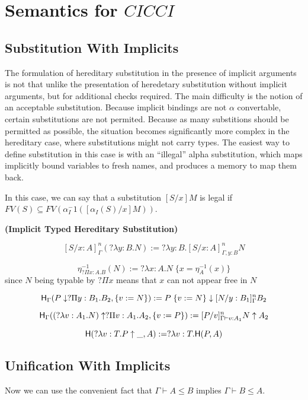 \section{Semantics for $CICCI$}


\subsection{Substitution With Implicits}

The formulation of hereditary substitution in the presence of 
implicit arguments is not that unlike the presentation of
heredetary substitution without implicit arguments, 
but for additional checks required.
The main difficulty is the notion of an acceptable substitution. 
Because implicit bindings are not $\alpha$ convertable, 
certain substitutions are not permited.  
Because as many substitions should be permitted as possible, 
the situation becomes significantly more complex in the 
hereditary case, where substitutions might not carry types.  
The easiest way to define substitution in this case is with an ``illegal'' alpha substitution, 
which maps implicitly bound variables to fresh names, 
and produces a memory to map them back.

In this case, we can say that a substitution $[S/x] M$ is legal if 
$FV(S) \subseteq FV(\alpha_I^-1( [\alpha_I(S)/x] M) )$.

\begin{definition}
\textbf{(Implicit Typed Hereditary Substitution)}


\[
[S / x : A]^n_{\Gamma } (?\lambda y : B . N) := ?\lambda y:B . [S / x : A]^n_{\Gamma, y : B} N
\] 

\[
\eta^{-1}_{?\Pi x : A . B}(N) := ?\lambda x : A . N \; \{ x = \eta^{-1}_A(x) \}
\] since $N$ being typable by $?\Pi x $ means that $x$ can not appear free in $N$

\[
\mathsf{H}_{\Gamma}(P \downarrow ?\Pi y : B_1 . B_2 , \{ v := N \} ) := P\; \{ v := N \} \downarrow [N/y : B_1]^n_{\Gamma}B_2
\]

\[
\mathsf{H}_{\Gamma} ((?\lambda v : A_1 . N) \uparrow ?\Pi v : A_1 . A_2 , \{ v := P \}) 
:= [P/v]^n_{\Gamma \vdash v : A_1} N \uparrow A_2
\]

\[ 
\mathsf{H}(?\lambda v : T . P \uparrow \_ , A) := ?\lambda v : T . \mathsf{H}(P,A)
\]

\label{def:hered}
\end{definition}



\subsection{Unification With Implicits}

Now we can use the convenient fact that $\Gamma \vdash A  \leq B$ implies $\Gamma \vdash B \leq A$.
